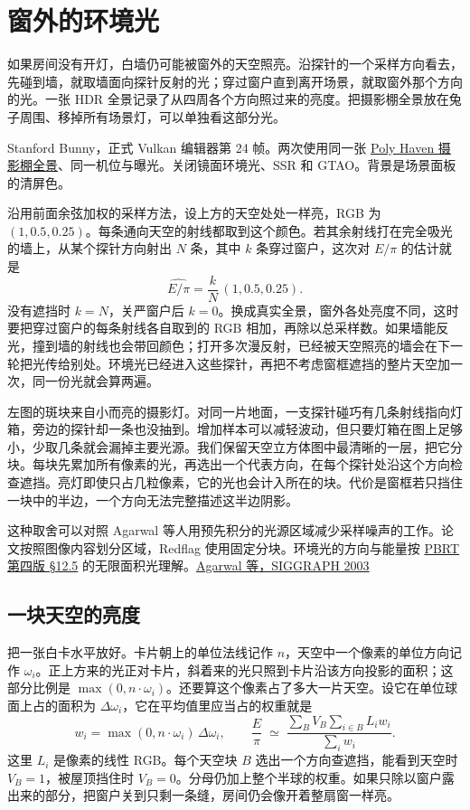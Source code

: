 \clearpage
\section{窗外的环境光}

如果房间没有开灯，白墙仍可能被窗外的天空照亮。沿探针的一个采样方向看去，先碰到墙，就取墙面向探针反射的光；穿过窗户直到离开场景，就取窗外那个方向的光。一张 HDR 全景记录了从四周各个方向照过来的亮度。把摄影棚全景放在兔子周围、移掉所有场景灯，可以单独看这部分光。

{\small\color{quiet}Stanford Bunny，正式 Vulkan 编辑器第 24 帧。两次使用同一张 \href{https://polyhaven.com/a/studio_small_09}{Poly Haven 摄影棚全景}、同一机位与曝光。关闭镜面环境光、SSR 和 GTAO。背景是场景面板的清屏色。}

沿用前面余弦加权的采样方法，设上方的天空处处一样亮，RGB 为 $(1,0.5,0.25)$。每条通向天空的射线都取到这个颜色。若其余射线打在完全吸光的墙上，从某个探针方向射出 $N$ 条，其中 $k$ 条穿过窗户，这次对 $E/\pi$ 的估计就是
\[
 \widehat{E/\pi}=\frac{k}{N}\,(1,0.5,0.25).
\]
没有遮挡时 $k=N$，关严窗户后 $k=0$。换成真实全景，窗外各处亮度不同，这时要把穿过窗户的每条射线各自取到的 RGB 相加，再除以总采样数。如果墙能反光，撞到墙的射线也会带回颜色；打开多次漫反射，已经被天空照亮的墙会在下一轮把光传给别处。环境光已经进入这些探针，再把不考虑窗框遮挡的整片天空加一次，同一份光就会算两遍。

左图的斑块来自小而亮的摄影灯。对同一片地面，一支探针碰巧有几条射线指向灯箱，旁边的探针却一条也没抽到。增加样本可以减轻波动，但只要灯箱在图上足够小，少取几条就会漏掉主要光源。我们保留天空立方体图中最清晰的一层，把它分块。每块先累加所有像素的光，再选出一个代表方向，在每个探针处沿这个方向检查遮挡。亮灯即使只占几粒像素，它的光也会计入所在的块。代价是窗框若只挡住一块中的半边，一个方向无法完整描述这半边阴影。

这种取舍可以对照 Agarwal 等人用预先积分的光源区域减少采样噪声的工作。论文按照图像内容划分区域，Redflag 使用固定分块。环境光的方向与能量按 \href{https://pbr-book.org/4ed/Light_Sources/Infinite_Area_Lights}{PBRT 第四版 §12.5} 的无限面积光理解。\href{https://graphics.ucsd.edu/~henrik/papers/structured/}{Agarwal 等，SIGGRAPH 2003}

\clearpage
\subsection{一块天空的亮度}
把一张白卡水平放好。卡片朝上的单位法线记作 $n$，天空中一个像素的单位方向记作 $\omega_i$。正上方来的光正对卡片，斜着来的光只照到卡片沿该方向投影的面积；这部分比例是 $\max(0,n\cdot\omega_i)$。还要算这个像素占了多大一片天空。设它在单位球面上占的面积为 $\Delta\omega_i$，它在平均值里应当占的权重就是
\[
 w_i=\max(0,n\cdot\omega_i)\,\Delta\omega_i,\qquad
 \frac E\pi \;\simeq\;
 \frac{\displaystyle\sum_B V_B\sum_{i\in B} L_i w_i}{\displaystyle\sum_i w_i}.
\]
这里 $L_i$ 是像素的线性 RGB。每个天空块 $B$ 选出一个方向查遮挡，能看到天空时 $V_B=1$，被屋顶挡住时 $V_B=0$。分母仍加上整个半球的权重。如果只除以窗户露出来的部分，把窗户关到只剩一条缝，房间仍会像开着整扇窗一样亮。

